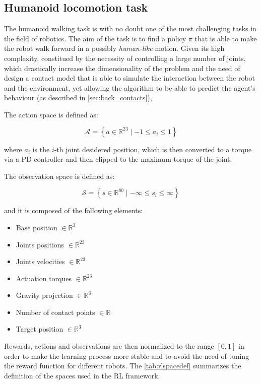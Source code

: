 \subsection{Humanoid locomotion task}
The humanoid walking task is with no doubt one of the most challenging tasks in the field of robotics. The aim of the task is to find a policy $\pi$ that is able to make the robot walk forward in a possibly \textit{human-like} motion. Given its high complexity, constitued by the necessity of controlling a large number of joints, which drastically increase the dimensionality of the problem and the need of design a contact model that is able to simulate the interaction between the robot and the environment, yet allowing the algorithm to be able to predict the agent's behaviour (as described in \cref{sec:back_contacts}),

The action space is defined as:

\begin{equation}
    \mathcal{A} = \left\{ a \in \mathbb{R} ^{23} \mid -1 \leq a_i \leq 1 \right\}
\end{equation}

where $a_i$ is the $i$-th joint desidered position, which is then converted to a torque via a PD controller and then clipped to the maximum torque of the joint.

The observation space is defined as:

\begin{equation}
    \mathcal{S} = \left\{ s \in \mathbb{R} ^{80} \mid -\infty \leq s_i \leq \infty \right\}
\end{equation}

and it is composed of the following elements:

\begin{itemize}
    \item Base position $\in \mathbb{R} ^{3}$
    \item Joints positions $\in \mathbb{R} ^{23}$
    \item Joints velocities $\in \mathbb{R} ^{23}$
    \item Actuation torques $\in \mathbb{R} ^{23}$
    \item Gravity projection $\in \mathbb{R} ^{3}$
    \item Number of contact points $\in \mathbb{R}$
    \item Target position $\in \mathbb{R} ^{3}$
\end{itemize}

Rewards, actions and observations are then normalized to the range $[0,1]$ in order to make the learning process more stable and to avoid the need of tuning the reward function for different robots. The \cref{tab:rlspacedef} summarizes the definition of the spaces used in the \ac{RL} framework.

